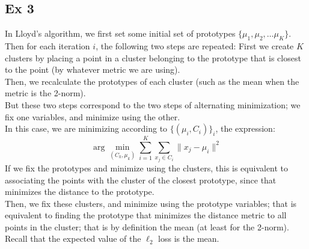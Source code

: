 \documentclass[12pt]{article}
\begin{document}
\newpage

\subsection*{Ex 3}

In Lloyd's algorithm, we first
set some initial set of prototypes
$ \{\mu_1, \mu_2, \dots \mu_K \}$. \\
Then for each iteration $i$,
the following two steps are repeated:
First we create $K$
clusters by placing a point in a cluster
belonging to the prototype that is closest
to the point (by whatever metric we are
using). \\
Then, we recalculate the prototypes of
each cluster (such as the mean when the
metric is the 2-norm). \\

But these two steps correspond
to the two steps of alternating minimization;
we fix one variables, and minimize using 
the other. \\
In this case, we are minimizing according
to $\{(\mu_i, C_i)\}_i$, the expression:
\[ \arg \min_{(C_k, \mu_k)} \sum_{i=1}^K \sum_{x_j \in C_i}
\|x_j - \mu_i\|^2 \]
If we fix the prototypes and minimize using
the clusters, this is equivalent to associating
the points with the cluster of the closest
prototype, since that minimizes the distance
to the prototype. \\
Then, we fix these clusters, and minimize using the
prototype variables; that is equivalent to finding
the prototype that minimizes the distance metric
to all points in the cluster; that is by definition
the mean (at least for the 2-norm). Recall that
the expected value of the $\ell_2$ loss is the mean. \\ 

\end{document}
